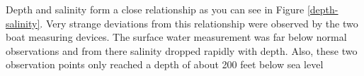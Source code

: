 \documentclass[11pt]{article}
\begin{document}
Depth and salinity form a close relationship as you can see in Figure \ref {depth-salinity}.  Very strange deviations from this relationship were observed by the two boat measuring devices. The surface water measurement was far below normal observations and from there salinity dropped rapidly with depth.  Also, these two observation points only reached a depth of about 200 feet below sea level
\end{document}
